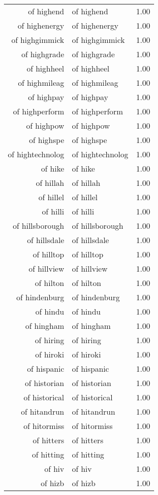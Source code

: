 \begin{table}[ht]
\begin{tabular}{rlr}
  of highend & of highend & 1.00 \\ 
  of highenergy & of highenergy & 1.00 \\ 
  of highgimmick & of highgimmick & 1.00 \\ 
  of highgrade & of highgrade & 1.00 \\ 
  of highheel & of highheel & 1.00 \\ 
  of highmileag & of highmileag & 1.00 \\ 
  of highpay & of highpay & 1.00 \\ 
  of highperform & of highperform & 1.00 \\ 
  of highpow & of highpow & 1.00 \\ 
  of highspe & of highspe & 1.00 \\ 
  of hightechnolog & of hightechnolog & 1.00 \\ 
  of hike & of hike & 1.00 \\ 
  of hillah & of hillah & 1.00 \\ 
  of hillel & of hillel & 1.00 \\ 
  of hilli & of hilli & 1.00 \\ 
  of hillsborough & of hillsborough & 1.00 \\ 
  of hillsdale & of hillsdale & 1.00 \\ 
  of hilltop & of hilltop & 1.00 \\ 
  of hillview & of hillview & 1.00 \\ 
  of hilton & of hilton & 1.00 \\ 
  of hindenburg & of hindenburg & 1.00 \\ 
  of hindu & of hindu & 1.00 \\ 
  of hingham & of hingham & 1.00 \\ 
  of hiring & of hiring & 1.00 \\ 
  of hiroki & of hiroki & 1.00 \\ 
  of hispanic & of hispanic & 1.00 \\ 
  of historian & of historian & 1.00 \\ 
  of historical & of historical & 1.00 \\ 
  of hitandrun & of hitandrun & 1.00 \\ 
  of hitormiss & of hitormiss & 1.00 \\ 
  of hitters & of hitters & 1.00 \\ 
  of hitting & of hitting & 1.00 \\ 
  of hiv & of hiv & 1.00 \\ 
  of hizb & of hizb & 1.00 \\ 

\end{tabular}
\end{table}
